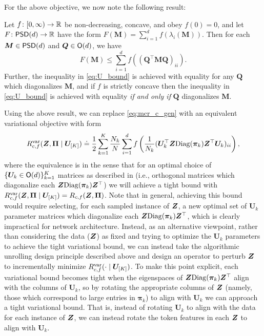 \documentclass[../../book-main.tex]{subfiles}
\begin{document}
For the above objective, we now note the following result:
\begin{theorem}
\label{thm:var_concave}
    Let \(f \colon [0, \infty) \to \mathbb{R}\) be non-decreasing, concave, and obey \(f(0) = 0\), and let \(F \colon \mathsf{PSD}(d) \to \mathbb{R}\) have the form \(F(\bm M) = \sum_{i = 1}^{d}f(\lambda_{i}(\bm M))\). Then for each \(\bm M \in \mathsf{PSD}(d)\) and \(\bm Q \in \mathsf{O}(d)\), we have
    \begin{equation}
        \label{eq:U_bound}
        F(\bm M) \leq  \sum_{i=1}^{d} f\left( (\bm Q^{\top} \bm M \bm Q)_{ii} \right).
    \end{equation}
    Further, the inequality in \eqref{eq:U_bound} is achieved with equality for any $\bm Q$ which diagonalizes $\bm M$, and if $f$ is strictly concave then the inequality in \eqref{eq:U_bound} is achieved with equality \textit{if and only if} $\bm Q$ diagonalizes $\bm M$. 
\end{theorem}

Using the above result, we can replace \eqref{eq:mcr_c_gen} with an equivalent variational objective with form
\vspace{-2mm}
\begin{equation}
    \label{eq:var_comp}
    R^{\rm var}_{c,f} (\bm{Z},\bm \Pi \mid \bm U_{[K]}) \doteq \frac{1}{2}\sum_{k=1}^K \frac{N_k}{N} \sum_{i=1}^{d} f\left(\frac{1}{N_k} (\bm U_{k}^{\top} \bm{Z} \mathrm{Diag}(\bm \pi_k) \bm Z^{\top} \bm U_{k})_{ii} \right),
\end{equation}
where the equivalence is in the sense that for an optimal choice of $\{ \bm U_k \in \mathsf{O}(d)\}_{k=1}^K$ matrices as described in  (i.e., orthogonal matrices which diagonalize each $\bm{Z} \mathrm{Diag}(\bm \pi_k) \bm{Z}^\top $) we will achieve a tight bound with $ R^{\rm var}_{c,f} (\bm{Z},\bm \Pi \mid \bm U_{[K]}) = R_{c,f} (\bm{Z},\bm \Pi)$. Note that in general, achieving this bound would require selecting, for each sampled instance of $\bm{Z}$, a new optimal set of $\bm U_{k}$ parameter matrices which diagonalize each $\bm{Z}\mathrm{Diag}(\bm \pi_{k})\bm{Z}^{\top}$, which is clearly impractical for network architecture. 
Instead, as an alternative viewpoint, rather than considering the data ($\bm{Z}$) as fixed and trying to optimize the $\bm U_k$ parameters to achieve the tight variational bound, we can instead take the algorithmic unrolling design principle described above and design an operator to perturb $\bm{Z}$ to incrementally minimize $R_{c, f}^{\rm var}(\cdot \mid \bm U_{[K]})$.  To make this point explicit, each variational bound becomes tight when the eigenspaces of $\bm{Z} \mathrm{Diag}(\bm \pi_k) \bm{Z}
^\top$ align with the columns of $\bm U_k$, so by rotating the appropriate columns of $\bm{Z}$ (namely, those which correspond to large entries in $\bm \pi_k$) to align with $\bm U_k$ we can approach a tight variational bound. That is, instead of rotating $\bm U_k$ to align with the data for each instance of $\bm{Z}$, we can instead rotate the token features in each $\bm{Z}$ to align with $\bm U_k$. 
\end{document}
